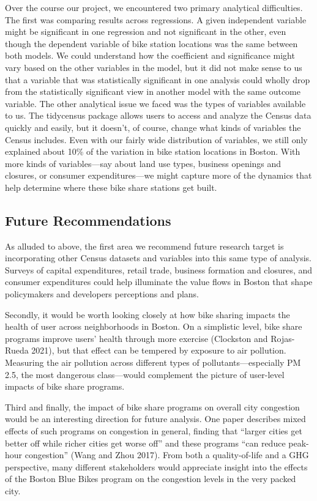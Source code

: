 \documentclass[
  12pt,
]{article}
\begin{document}
Over the course our project, we encountered two primary analytical
difficulties. The first was comparing results across regressions. A
given independent variable might be significant in one regression and
not significant in the other, even though the dependent variable of bike
station locations was the same between both models. We could understand
how the coefficient and significance might vary based on the other
variables in the model, but it did not make sense to us that a variable
that was statistically significant in one analysis could wholly drop
from the statistically significant view in another model with the same
outcome variable. The other analytical issue we faced was the types of
variables available to us. The tidycensus package allows users to access
and analyze the Census data quickly and easily, but it doesn't, of
course, change what kinds of variables the Census includes. Even with
our fairly wide distribution of variables, we still only explained about
10\% of the variation in bike station locations in Boston. With more
kinds of variables---say about land use types, business openings and
closures, or consumer expenditures---we might capture more of the
dynamics that help determine where these bike share stations get built.

\hypertarget{future-recommendations}{%
\subsection{Future Recommendations}\label{future-recommendations}}

As alluded to above, the first area we recommend future research target
is incorporating other Census datasets and variables into this same type
of analysis. Surveys of capital expenditures, retail trade, business
formation and closures, and consumer expenditures could help illuminate
the value flows in Boston that shape policymakers and developers
perceptions and plans.

Secondly, it would be worth looking closely at how bike sharing impacts
the health of user across neighborhoods in Boston. On a simplistic
level, bike share programs improve users' health through more exercise
(Clockston and Rojas-Rueda 2021), but that effect can be tempered by
exposure to air pollution. Measuring the air pollution across different
types of pollutants---especially PM 2.5, the most dangerous
class---would complement the picture of user-level impacts of bike share
programs.

Third and finally, the impact of bike share programs on overall city
congestion would be an interesting direction for future analysis. One
paper describes mixed effects of such programs on congestion in general,
finding that ``larger cities get better off while richer cities get
worse off'' and these programs ``can reduce peak-hour congestion'' (Wang
and Zhou 2017). From both a quality-of-life and a GHG perspective, many
different stakeholders would appreciate insight into the effects of the
Boston Blue Bikes program on the congestion levels in the very packed
city.
\end{document}
